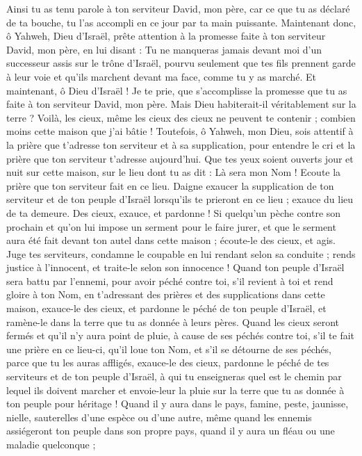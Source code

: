 \begin{multicols}{2}
Ainsi tu as tenu parole à ton serviteur David, mon père, car ce que tu as déclaré de ta bouche, tu l'as accompli en ce jour par ta main puissante.
Maintenant donc, ô Yahweh, Dieu d'Israël, prête attention à la promesse faite à ton serviteur David, mon père, en lui disant : Tu ne manqueras jamais devant moi d’un successeur assis sur le trône d'Israël, pourvu seulement que tes fils prennent garde à leur voie et qu’ils marchent devant ma face, comme tu y as marché.
Et maintenant, ô Dieu d'Israël ! Je te prie, que s’accomplisse la promesse que tu as faite à ton serviteur David, mon père.
Mais Dieu habiterait-il véritablement sur la terre ? Voilà, les cieux, même les cieux des cieux ne peuvent te contenir ; combien moins cette maison que j'ai bâtie !
Toutefois, ô Yahweh, mon Dieu, sois attentif à la prière que t’adresse ton serviteur et à sa supplication, pour entendre le cri et la prière que ton serviteur t’adresse aujourd'hui.
Que tes yeux soient ouverts jour et nuit sur cette maison, sur le lieu dont tu as dit : Là sera mon Nom ! Ecoute la prière que ton serviteur fait en ce lieu.
Daigne exaucer la supplication de ton serviteur et de ton peuple d'Israël lorsqu’ils te prieront en ce lieu ; exauce du lieu de ta demeure. Des cieux, exauce, et pardonne !
Si quelqu'un pèche contre son prochain et qu’on lui impose un serment pour le faire jurer, et que le serment aura été fait devant ton autel dans cette maison ;
écoute-le des cieux, et agis. Juge tes serviteurs, condamne le coupable en lui rendant selon sa conduite ; rends justice à l’innocent, et traite-le selon son innocence !
Quand ton peuple d'Israël sera battu par l'ennemi, pour avoir péché contre toi, s’il revient à toi et rend gloire à ton Nom, en t’adressant des prières et des supplications dans cette maison,
exauce-le des cieux, et pardonne le péché de ton peuple d'Israël, et ramène-le dans la terre que tu as donnée à leurs pères.
Quand les cieux seront fermés et qu'il n'y aura point de pluie, à cause de ses péchés contre toi, s'il te fait une prière en ce lieu-ci, qu’il loue ton Nom, et s’il se détourne de ses péchés, parce que tu les auras affligés,
exauce-le des cieux, pardonne le péché de tes serviteurs et de ton peuple d'Israël, à qui tu enseigneras quel est le chemin par lequel ils doivent marcher et envoie-leur la pluie sur la terre que tu as donnée à ton peuple pour héritage !
Quand il y aura dans le pays, famine, peste, jaunisse, nielle, sauterelles d’une espèce ou d’une autre, même quand les ennemis assiégeront ton peuple dans son propre pays, quand il y aura un fléau ou une maladie quelconque ;

\end{multicols}
